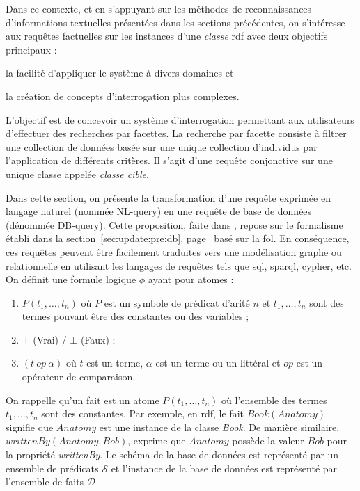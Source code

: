 Dans ce contexte, et en s'appuyant sur les méthodes de reconnaissances d'informations textuelles présentées dans les sections précédentes, on s'intéresse aux requêtes factuelles sur les instances d'une \emph{classe} \gls{rdf} avec deux objectifs principaux :
\begin{enumerate*}[label=(\roman*)]
    \item la facilité d'appliquer le système à divers domaines et
    \item la création de concepts d'interrogation plus complexes.
\end{enumerate*}
L'objectif est de concevoir un système d'interrogation permettant aux utilisateurs d'effectuer des recherches par facettes.
La recherche par facette consiste à filtrer une collection de données basée sur une unique collection d'individus par l'application de différents critères.
Il s'agit d'une requête conjonctive sur une unique classe appelée \emph{classe cible}.

Dans cette section, on présente la transformation d'une requête exprimée en langage naturel (nommée NL-query) en une requête de base de données (dénommée DB-query).
Cette proposition, faite dans \cite{amaviNaturalLanguageQuerying2020}, repose sur le formalisme établi dans la section~\ref{sec:update:pre:db}, page~\pageref{sec:update:pre:db} basé sur la \gls{fol}.
En conséquence, ces requêtes peuvent être facilement traduites vers une modélisation graphe ou relationnelle en utilisant les langages de requêtes tels que \gls{sql}, \gls{sparql}, \gls{cypher}, etc.
On définit une formule logique $\phi$ ayant pour atomes :
\begin{enumerate}
    \item $P(t_1, \dots, t_n)$ où $P$ est un symbole de prédicat d'arité $n$ et $t_1, \dots, t_n$ sont des termes pouvant être des constantes ou des variables ;
    \item $\top$ (Vrai) / $\bot$ (Faux) ;
    \item $(t\ op\ \alpha)$ où $t$ est un terme, $\alpha$ est un terme ou un littéral et $op$ est un opérateur de comparaison.
\end{enumerate}
On rappelle qu'un fait est un atome $P(t_1, \dots, t_n)$ où l'ensemble des termes $t_1, \dots, t_n$ sont des constantes.
Par exemple, en \gls{rdf}, le fait $Book(Anatomy)$ signifie que $Anatomy$ est une instance de la classe \emph{Book}.
De manière similaire, $writtenBy(Anatomy, Bob)$, exprime que $Anatomy$ possède la valeur $Bob$ pour la propriété \textit{writtenBy}.
Le schéma de la base de données est représenté par un ensemble de prédicats $\mathcal{S}$ et l'instance de la base de données est représenté par l'ensemble de faits $\mathcal{D}$

